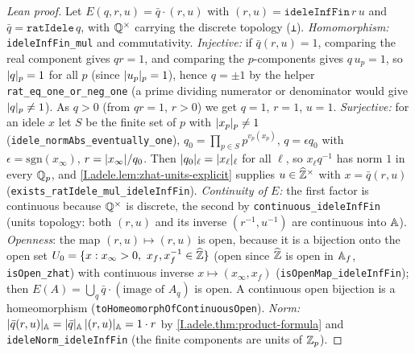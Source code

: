 \begin{proof}[Lean proof]
Let $E(q,r,u)=\bar q\cdot(r,u)$ with $(r,u)=\mathtt{ideleInfFin}\,r\,u$ and $\bar q=\mathtt{ratIdele}\,q$, with $\mathbb{Q}^\times$ carrying the discrete topology (\texttt{⊥}). \emph{Homomorphism:} \texttt{ideleInfFin\_mul} and commutativity. \emph{Injective:} if $\bar q(r,u)=1$, comparing the real component gives $qr=1$, and comparing the $p$-components gives $q\,u_p=1$, so $\lvert q\rvert_p=1$ for all $p$ (since $\lvert u_p\rvert_p=1$), hence $q=\pm1$ by the helper \texttt{rat\_eq\_one\_or\_neg\_one} (a prime dividing numerator or denominator would give $\lvert q\rvert_p\ne1$). As $q>0$ (from $qr=1$, $r>0$) we get $q=1$, $r=1$, $u=1$. \emph{Surjective:} for an idele $x$ let $S$ be the finite set of $p$ with $\lvert x_p\rvert_p\ne1$ (\texttt{idele\_normAbs\_eventually\_one}), $q_0=\prod_{p\in S}p^{v_p(x_p)}$, $q=\epsilon q_0$ with $\epsilon=\mathrm{sgn}(x_\infty)$, $r=\lvert x_\infty\rvert/q_0$. Then $\lvert q_0\rvert_\ell=\lvert x_\ell\rvert_\ell$ for all $\ell$, so $x_\ell q^{-1}$ has norm $1$ in every $\mathbb{Q}_p$, and \cref{I.adele.lem:zhat-units-explicit} supplies $u\in\widehat{\mathbb{Z}}^\times$ with $x=\bar q(r,u)$ (\texttt{exists\_ratIdele\_mul\_ideleInfFin}). \emph{Continuity of $E$:} the first factor is continuous because $\mathbb{Q}^\times$ is discrete, the second by \texttt{continuous\_ideleInfFin} (units topology: both $(r,u)$ and its inverse $(r^{-1},u^{-1})$ are continuous into $\mathbb{A}$). \emph{Openness}: the map $(r,u)\mapsto(r,u)$ is open, because it is a bijection onto the open set $U_0=\{x: x_\infty>0,\ x_f,x_f^{-1}\in\Zhat\}$ (open since $\widehat{\mathbb{Z}}$ is open in $\mathbb{A}_f$, \texttt{isOpen\_zhat}) with continuous inverse $x\mapsto(x_\infty,x_f)$ (\texttt{isOpenMap\_ideleInfFin}); then $E(A)=\bigcup_q\bar q\cdot(\text{image of }A_q)$ is open. A continuous open bijection is a homeomorphism (\texttt{toHomeomorphOfContinuousOpen}). \emph{Norm:} $\lvert\bar q(r,u)\rvert_{\mathbb{A}}=\lvert\bar q\rvert_{\mathbb{A}}\,\lvert(r,u)\rvert_{\mathbb{A}}=1\cdot r$ by \cref{I.adele.thm:product-formula} and \texttt{ideleNorm\_ideleInfFin} (the finite components are units of $\mathbb{Z}_p$).
\end{proof}

